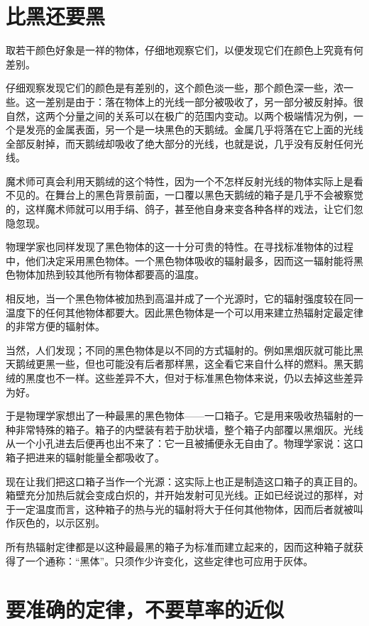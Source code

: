 \section{比黑还要黑}

取若干颜色好象是一祥的物体，仔细地观察它们，以便发现它们在颜色上究竟有何差别。

仔细观察发现它们的颜色是有差别的，这个颜色淡一些，那个颜色深一些，浓一些。这一差别是由于：落在物体上的光线一部分被吸收了，另一部分被反射掉。很自然，这两个分量之间的关系可以在极广的范围内变动。以两个极端情况为例，一个是发亮的金属表面，另一个是一块黑色的天鹅绒。金属几乎将落在它上面的光线全部反射掉，而天鹅绒却吸收了绝大部分的光线，也就是说，几乎没有反射任何光线。

魔术师可真会利用天鹅绒的这个特性，因为一个不怎样反射光线的物体实际上是看不见的。在舞台上的黑色背景前面，一口覆以黑色天鹅绒的箱子是几乎不会被察觉的，这样魔术师就可以用手绢、鸽子，甚至他自身来变各种各样的戏法，让它们忽隐忽现。

物理学家也同样发现了黑色物体的这一十分可贵的特性。在寻找标准物体的过程中，他们决定采用黑色物体。一个黑色物体吸收的辐射最多，因而这一辐射能将黑色物体加热到较其他所有物体都要高的温度。

相反地，当一个黑色物体被加热到高温并成了一个光源时，它的辐射强度较在同一温度下的任何其他物体都要大。因此黑色物体是一个可以用来建立热辐射定最定律的非常方便的辐射体。

当然，人们发现；不同的黑色物体是以不同的方式辐射的。例如黑烟灰就可能比黑天鹅绒更黑一些，但也可能没有后者那样黑，这全看它来自什么样的燃料。黑天鹅绒的黑度也不一样。这些差异不大，但对于标准黑色物体来说，仍以去掉这些差异为好。

于是物理学家想出了一种最黑的黑色物体——一口箱子。它是用来吸收热辐射的一种非常特殊的箱子。箱子的内壁装有若于肋状墙，整个箱子内部覆以黑烟灰。光线从一个小孔进去后便再也出不来了：它一且被捕便永无自由了。物理学家说：这口箱子把进来的辐射能量全都吸收了。

现在让我们把这口箱子当作一个光源：这实际上也正是制造这口箱子的真正目的。箱壁充分加热后就会变成白炽的，并开始发射可见光线。正如已经说过的那样，对于一定温度而言，这种箱子的热与光的辐射将大于任何其他物体，因而后者就被叫作灰色的，以示区别。

所有热辐射定律都是以这种最最黑的箱子为标准而建立起来的，因而这种箱子就获得了一个通称：“黑体”。只须作少许变化，这些定律也可应用于灰体。

\section{要准确的定律，不要草率的近似}


